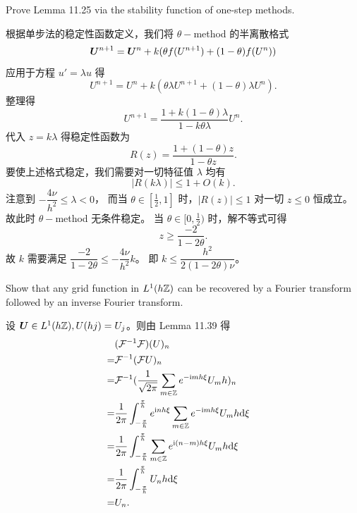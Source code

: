 \documentclass[lang=cn,a4paper,newtx,bibend=bibtex]{elegantpaper}
\begin{document}
\begin{prob}[Exercise 11.26]
  Prove Lemma 11.25 via the stability function of one-step methods.
\end{prob}

\begin{solution}
  根据单步法的稳定性函数定义，我们将 $\theta-$method 的半离散格式
  \begin{equation*}
    \bm{U}^{n+1} = \bm{U}^n + k(\theta f(U^{n+1}) + (1-\theta)f(U^n))
  \end{equation*}
  应用于方程 $u' = \lambda u$ 得
  \begin{equation*}
    U^{n+1} = U^n + k(\theta\lambda U^{n+1} + (1-\theta)\lambda U^n).
  \end{equation*}
  整理得
  \begin{equation*}
    U^{n+1} = \dfrac{1+k(1-\theta)\lambda}{1-k\theta\lambda}U^n.
  \end{equation*}
  代入 $z=k\lambda$ 得稳定性函数为
  \begin{equation*}
    R(z) = \dfrac{1+(1-\theta)z}{1-\theta z}.
  \end{equation*}
  要使上述格式稳定，我们需要对一切特征值 $\lambda$ 均有
  \begin{equation*}
    |R(k\lambda)|\leq 1+O(k).
  \end{equation*}
  注意到 $-\dfrac{4\nu}{h^2}\leq \lambda < 0$，
  而当 $\theta\in [\frac 12,1]$ 时，$|R(z)|\leq 1$ 对一切 $z\leq 0$ 恒成立。
  故此时 $\theta-$method 无条件稳定。
  当 $\theta\in [0,\frac 12)$ 时，解不等式可得
  \begin{equation*}
    z\geq \dfrac{-2}{1-2\theta}.
  \end{equation*}
  故 $k$ 需要满足 $\dfrac{-2}{1-2\theta}\leq -\dfrac{4\nu}{h^2}k$。
  即 $k\leq \dfrac{h^2}{2(1-2\theta)\nu}$。
\end{solution}

\begin{prob}[Exercise 11.41]
  Show that any grid function in $L^1(h\mathbb{Z})$ can be recovered by a Fourier transform
  followed by an inverse Fourier transform.
\end{prob}

\begin{solution}
  设 $\bm{U}\in L^1(h\mathbb{Z}), U(hj) = U_j$。则由 Lemma 11.39 得
  \begin{equation*}
    \begin{aligned}
      & (\mathcal{F}^{-1}\mathcal{F})(U)_n & \\
      = & \mathcal{F}^{-1}(\mathcal{F} U)_n & \\
      = & \mathcal{F}^{-1}(\frac 1{\sqrt{2\pi}}\sum_{m\in \mathbb{Z}}e^{-\mathrm{i} mh\xi}U_mh)_n & \\
      = & \frac 1{2\pi}\int_{-\frac{\pi}h}^{\frac{\pi}h}e^{\mathrm{i} nh\xi}\sum_{m\in \mathbb{Z}}e^{-\mathrm{i} mh\xi}U_mh\mathrm{d}\xi & \\
      = & \frac 1{2\pi}\int_{-\frac{\pi}h}^{\frac{\pi}h}\sum_{m\in \mathbb{Z}}e^{\mathrm{i}(n-m)h\xi}U_mh\mathrm{d} \xi & \\
      = & \frac 1{2\pi}\int_{-\frac{\pi}h}^{\frac{\pi}h}U_nh\mathrm{d}\xi & \\
      = & U_n. & \\
    \end{aligned}
  \end{equation*}
\end{solution}
\end{document}
